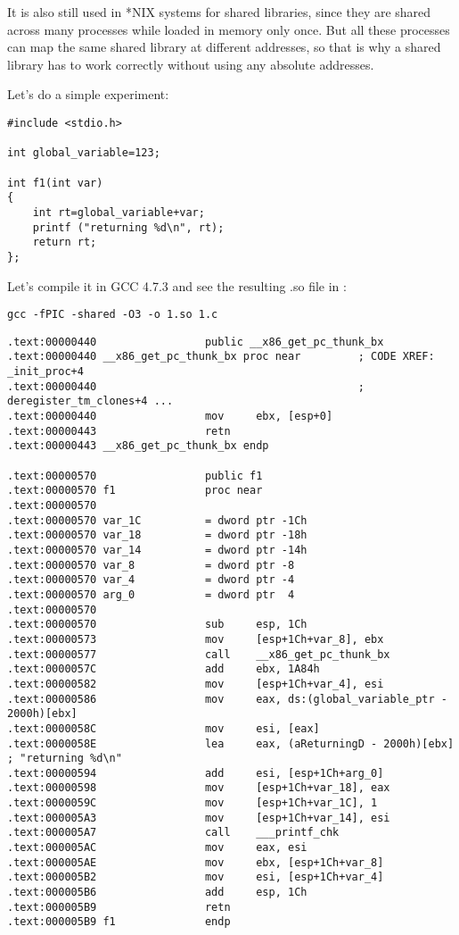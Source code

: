 It is also still used in *NIX systems for shared libraries, since they 
are shared across many processes while loaded in memory only once.
But all these processes can 
map the same shared library at different addresses, so that is why
a shared library has to work correctly without using any absolute addresses.

Let's do a simple experiment:

\begin{lstlisting}
#include <stdio.h>

int global_variable=123;

int f1(int var)
{
    int rt=global_variable+var;
    printf ("returning %d\n", rt);
    return rt;
};
\end{lstlisting}

Let's compile it in GCC 4.7.3 and see the resulting .so file in \IDA:

\begin{lstlisting}
gcc -fPIC -shared -O3 -o 1.so 1.c
\end{lstlisting}

\begin{lstlisting}[caption=GCC 4.7.3]
.text:00000440                 public __x86_get_pc_thunk_bx
.text:00000440 __x86_get_pc_thunk_bx proc near         ; CODE XREF: _init_proc+4
.text:00000440                                         ; deregister_tm_clones+4 ...
.text:00000440                 mov     ebx, [esp+0]
.text:00000443                 retn
.text:00000443 __x86_get_pc_thunk_bx endp

.text:00000570                 public f1
.text:00000570 f1              proc near
.text:00000570
.text:00000570 var_1C          = dword ptr -1Ch
.text:00000570 var_18          = dword ptr -18h
.text:00000570 var_14          = dword ptr -14h
.text:00000570 var_8           = dword ptr -8
.text:00000570 var_4           = dword ptr -4
.text:00000570 arg_0           = dword ptr  4
.text:00000570
.text:00000570                 sub     esp, 1Ch
.text:00000573                 mov     [esp+1Ch+var_8], ebx
.text:00000577                 call    __x86_get_pc_thunk_bx
.text:0000057C                 add     ebx, 1A84h
.text:00000582                 mov     [esp+1Ch+var_4], esi
.text:00000586                 mov     eax, ds:(global_variable_ptr - 2000h)[ebx]
.text:0000058C                 mov     esi, [eax]
.text:0000058E                 lea     eax, (aReturningD - 2000h)[ebx] ; "returning %d\n"
.text:00000594                 add     esi, [esp+1Ch+arg_0]
.text:00000598                 mov     [esp+1Ch+var_18], eax
.text:0000059C                 mov     [esp+1Ch+var_1C], 1
.text:000005A3                 mov     [esp+1Ch+var_14], esi
.text:000005A7                 call    ___printf_chk
.text:000005AC                 mov     eax, esi
.text:000005AE                 mov     ebx, [esp+1Ch+var_8]
.text:000005B2                 mov     esi, [esp+1Ch+var_4]
.text:000005B6                 add     esp, 1Ch
.text:000005B9                 retn
.text:000005B9 f1              endp
\end{lstlisting}

